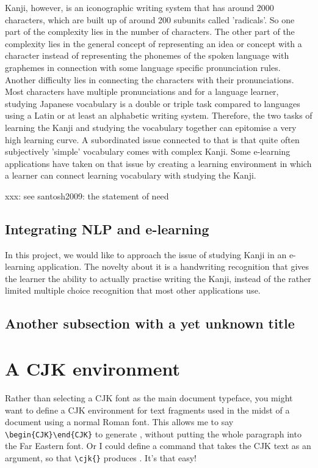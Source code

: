 Kanji, however, is an iconographic writing system that has around 2000 characters, which are built up of around 200 subunits called 'radicals'. So one part of the complexity lies in the number of characters. The other part of the complexity lies in the general concept of representing an idea or concept with a character instead of representing the phonemes of the spoken language with graphemes in connection with some language specific pronunciation rules. Another difficulty lies in connecting the characters with their pronunciations. Most characters have multiple pronunciations and for a language learner, studying Japanese vocabulary is a double or triple task compared to languages using a Latin or at least an alphabetic writing system. Therefore, the two tasks of learning the Kanji and studying the vocabulary together can epitomise a very high learning curve. A subordinated issue connected to that is that quite often subjectively 'simple' vocabulary comes with complex Kanji.
Some e-learning applications have taken on that issue by creating a learning environment in which a learner can connect learning vocabulary with studying the Kanji.

xxx: see santosh2009: the statement of need

\subsection{Integrating NLP and e-learning}
In this project, we would like to approach the issue of studying Kanji in an e-learning application. The novelty about it is a handwriting recognition that gives the learner the ability to actually practise writing the Kanji, instead of the rather limited multiple choice recognition that most other applications use.


\subsection{Another subsection with a yet unknown title}

\section{A CJK environment}

Rather than selecting a CJK font as the main document typeface, you might want to define a CJK environment for text fragments used in the midst of a document using a normal Roman font. This allows me to say 
\verb|\begin{CJK}|\verb|\end{CJK}| to generate , without putting the whole paragraph into the Far Eastern font. Or I could define a command that takes the CJK text as an argument, so that \verb|\cjk{|\verb|}| produces . It's that easy!

